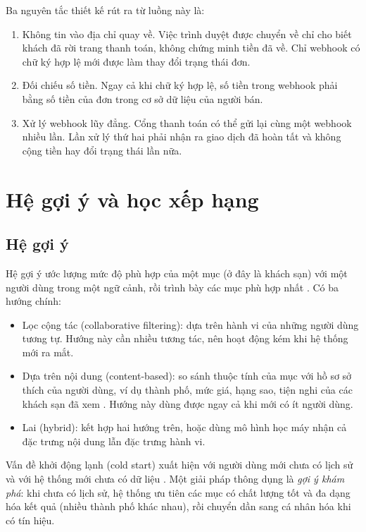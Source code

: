 Ba nguyên tắc thiết kế rút ra từ luồng này là:
\begin{enumerate}
\item Không tin vào địa chỉ quay về. Việc trình duyệt được chuyển về  chỉ cho biết khách đã rời trang thanh toán, không chứng minh tiền đã về. Chỉ webhook có chữ ký hợp lệ mới được làm thay đổi trạng thái đơn.
\item Đối chiếu số tiền. Ngay cả khi chữ ký hợp lệ, số tiền trong webhook phải bằng số tiền của đơn trong cơ sở dữ liệu của người bán.
\item Xử lý webhook lũy đẳng. Cổng thanh toán có thể gửi lại cùng một webhook nhiều lần. Lần xử lý thứ hai phải nhận ra giao dịch đã hoàn tất và không cộng tiền hay đổi trạng thái lần nữa.
\end{enumerate}

\section{Hệ gợi ý và học xếp hạng}\label{sec:recsys-theory}

\subsection{Hệ gợi ý}

Hệ gợi ý ước lượng mức độ phù hợp của một mục (ở đây là khách sạn) với một người dùng trong một ngữ cảnh, rồi trình bày các mục phù hợp nhất \cite{ricci2022}. Có ba hướng chính:
\begin{itemize}
\item Lọc cộng tác (collaborative filtering): dựa trên hành vi của những người dùng tương tự. Hướng này cần nhiều tương tác, nên hoạt động kém khi hệ thống mới ra mắt.
\item Dựa trên nội dung (content-based): so sánh thuộc tính của mục với hồ sơ sở thích của người dùng, ví dụ thành phố, mức giá, hạng sao, tiện nghi của các khách sạn đã xem \cite{lops2011}. Hướng này dùng được ngay cả khi mới có ít người dùng.
\item Lai (hybrid): kết hợp hai hướng trên, hoặc dùng mô hình học máy nhận cả đặc trưng nội dung lẫn đặc trưng hành vi.
\end{itemize}

Vấn đề khởi động lạnh (cold start) xuất hiện với người dùng mới chưa có lịch sử và với hệ thống mới chưa có dữ liệu \cite{schein2002}. Một giải pháp thông dụng là \emph{gợi ý khám phá}: khi chưa có lịch sử, hệ thống ưu tiên các mục có chất lượng tốt và đa dạng hóa kết quả (nhiều thành phố khác nhau), rồi chuyển dần sang cá nhân hóa khi có tín hiệu.

